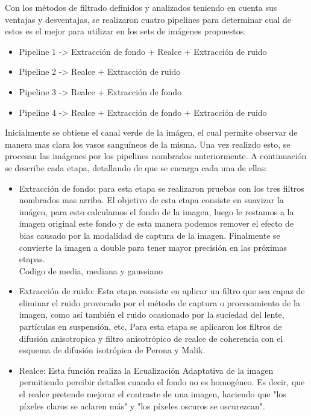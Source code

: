 Con los métodos de filtrado definidos y analizados teniendo en cuenta sus ventajas y desventajas, se realizaron cuatro pipelines para determinar cual de estos es el mejor para utilizar en los sets de im\'agenes propuestos.

\begin{itemize}
	    \item Pipeline 1 -> Extracci\'on de fondo  +  Realce  +  Extracci\'on de ruido
		\item Pipeline 2 -> Realce +  Extracci\'on de ruido
		\item Pipeline 3 -> Realce +  Extracci\'on de fondo
		\item Pipeline 4 -> Realce  + Extracci\'on de fondo   +  Extracci\'on de ruido
\end{itemize}


Inicialmente se obtiene el canal verde de la im\'agen, el cual permite observar de manera mas clara los vasos sangu\'ineos de la misma. Una vez realizdo esto, se procesan las im\'agenes por los pipelines nombrados anteriormente.
A continuaci\'on se describe cada etapa, detallando de que se encarga cada una de ellas:

\begin{itemize}
	\item Extracci\'on de fondo: para esta etapa se realizaron pruebas con los tres filtros nombrados mas arriba. El objetivo de  esta etapa consiste en suavizar la im\'agen, para esto calculamos el fondo de la imagen, luego le restamos a la imagen original este fondo y de esta manera podemos remover el efecto de bias causado por la modalidad de captura de la imagen. Finalmente se convierte la imagen a double para tener mayor precisión en las próximas etapas.\\
Codigo de media, mediana y gaussiano\\
	\item Extracción de ruido:  Esta etapa consiste en aplicar un filtro que sea capaz de eliminar el ruido provocado por el método de captura o procesamiento de la  imagen, como así también el ruido ocasionado por la suciedad del lente, partículas en suspensión, etc. 
Para esta etapa se aplicaron los filtros de difusión anisotropica y filtro anisotrópico de realce de coherencia con el esquema de difusión isotrópica de Perona y Malik.
	\item Realce: Esta función realiza la Ecualización Adaptativa de la imagen permitiendo percibir detalles cuando el fondo no es homogéneo. Es decir, que el realce pretende mejorar el contraste de una imagen, haciendo que "los píxeles claros se aclaren más" y "los píxeles oscuros se oscurezcan". 
\end{itemize}


